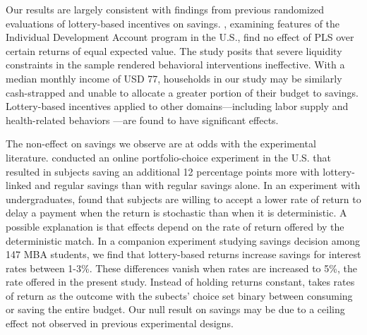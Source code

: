 \documentclass[11pt]{article}
\begin{document}
		Our results are largely consistent with findings from previous randomized evaluations of lottery-based incentives on savings. , examining features of the Individual Development Account program in the U.S., find no effect of PLS over certain returns of equal expected value. The study posits that severe liquidity constraints in the sample rendered behavioral interventions ineffective. With a median monthly income of USD 77, households in our study may be similarly cash-strapped and unable to allocate a greater portion of their budget to savings. Lottery-based incentives applied to other domains---including labor supply  and health-related behaviors ---are found to have significant effects.


		

		The non-effect on savings we observe are at odds with the experimental literature.  conducted an online portfolio-choice experiment in the U.S. that resulted in subjects saving an additional 12 percentage points more with lottery-linked and regular savings than with regular savings alone. In an experiment with undergraduates,  found that subjects are willing to accept a lower rate of return to delay a payment when the return is stochastic than when it is deterministic. A possible explanation is that effects depend on the rate of return offered by the deterministic match. In a companion experiment studying savings decision among 147 MBA students, we find that lottery-based returns increase savings for interest rates between 1-3\%. These differences vanish when rates are increased to 5\%, the rate offered in the present study. Instead of holding returns constant,  takes rates of return as the outcome with the subects' choice set binary between consuming or saving the entire budget. Our null result on savings may be due to a ceiling effect not observed in previous experimental designs.
\end{document}
